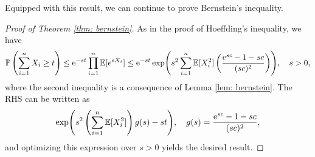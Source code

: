 Equipped with this result, we can continue to prove Bernstein's inequality.

\begin{proof}[Proof of Theorem \ref{thm: bernstein}]
As in the proof of Hoeffding's inequality, we have
\[
    \mathbb{P}\left(\sum_{i=1}^n X_i \geq t\right) \leq \mathrm{e}^{-st} \prod_{i=1}^n \mathbb{E}[e^{sX_i}] \leq \mathrm{e}^{-st} \exp( s^2 \sum_{i=1}^n \mathbb{E}[X_i^2] \left( \frac{\mathrm{e}^{sc} - 1 - sc}{(sc)^2} \right) ), \quad s > 0,
\]
where the second inequality is a consequence of Lemma \ref{lem: bernstein}. The RHS can be written as
\[
    \exp(s^2 \left( \sum_{i=1}^n \mathbb{E}[X_i^2] \right) g(s) - st ), \quad g(s) = \frac{\mathrm{e}^{sc} - 1 - sc}{(sc)^2},
\]
and optimizing this expression over $s > 0$ yields the desired result.
\end{proof}

